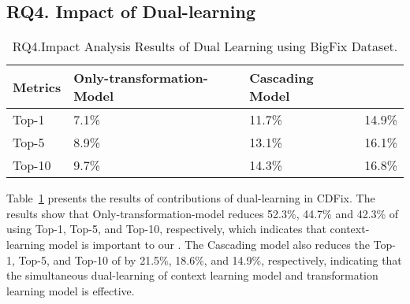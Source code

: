 \subsection{\bf RQ4. Impact of Dual-learning}



\begin{table}[t]
	\caption{RQ4.Impact Analysis Results of Dual Learning using BigFix Dataset.}
	{\small
		\begin{center}
			\renewcommand{\arraystretch}{1}
			\begin{tabular}{p{1cm}<{\centering}|p{2.7cm}<{\centering}|p{1.7cm}<{\centering}|p{1cm}<{\centering}}
				\hline
				Metrics & Only-transformation-Model & Cascading Model &  \tool \\			
				\hline
				Top-1   & 7.1\% & 11.7\% & 14.9\% \\ \hline
				Top-5	& 8.9\% & 13.1\% & 16.1\% \\ \hline
				Top-10	& 9.7\% & 14.3\% & 16.8\%\\ \hline
			
				\hline
			\end{tabular}
			
			\label{fig:rq4_results}
		\end{center}
	}
\end{table}


Table~\ref{fig:rq4_results} presents the results of contributions of dual-learning in CDFix. The results show that Only-transformation-model reduces 52.3\%, 44.7\% and 42.3\% of {\tool} using Top-1, Top-5, and Top-10, respectively, which indicates that context-learning model is important to our {\tool}. The Cascading model also reduces the Top-1, Top-5, and Top-10 of {\tool} by 21.5\%, 18.6\%, and 14.9\%, respectively, indicating that the simultaneous dual-learning of context learning model and transformation learning model is effective.  
